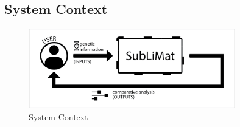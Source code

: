 \documentclass[12pt]{article}
\begin{document}
\subsection{System Context}


\begin{figure}[h!]
\begin{center}
 \includegraphics[width=0.8\textwidth]{sublimat_SystemContextFigure}
\caption{System Context}
\label{Fig_SystemContext} 
\end{center}
\end{figure}

\end{document}
